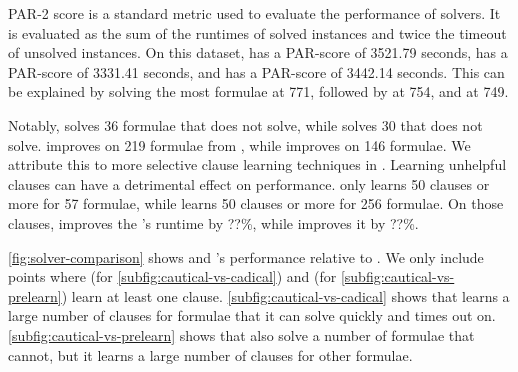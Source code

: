 PAR-2 score is a standard metric used to evaluate the performance of solvers.
It is evaluated as the sum of the runtimes of solved instances and twice the timeout of unsolved instances. On this dataset, \cadical has a PAR-score of 3521.79 seconds, \prelearn has a PAR-score of 3331.41 seconds, and \tool has a PAR-score of 3442.14 seconds. This can be explained by \prelearn solving the most formulae at 771, followed by \tool at 754, and \cadical at 749.

Notably, \tool solves 36 formulae that \cadical does not solve, while \prelearn solves 30 that \cadical does not solve. \tool improves on 219 formulae from \cadical, while \prelearn improves on 146 formulae. We attribute this to more selective \pr clause learning techniques in \tool. Learning unhelpful \pr clauses can have a detrimental effect on performance. \tool only learns 50 \pr clauses or more for 57 formulae, while \prelearn learns 50 \pr clauses or more for 256 formulae. On those clauses, \tool improves the \cadical's runtime by ??\%, while \prelearn improves it by ??\%.

\autoref{fig:solver-comparison} shows \tool and \cadical's performance relative to \cadical. We only include points where \tool (for \autoref{subfig:cautical-vs-cadical}) and \prelearn (for \autoref{subfig:cautical-vs-prelearn}) learn at least one \pr clause. \autoref{subfig:cautical-vs-cadical} shows that \tool learns a large number of \pr clauses for formulae that it can solve quickly and \cadical times out on. \autoref{subfig:cautical-vs-prelearn} shows that \prelearn also solve a number of formulae that \tool cannot, but it learns a large number of \pr clauses for other formulae.








